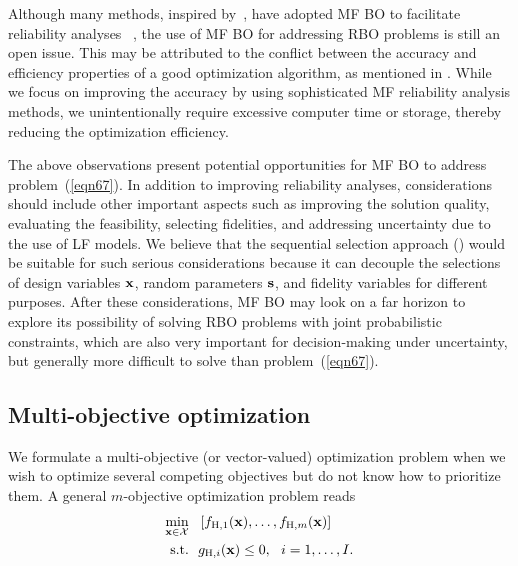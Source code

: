 \documentclass[journal ]{new-aiaa}
\begin{document}
	Although many methods, inspired by~\citet{Bichon2008}, have adopted MF BO to facilitate reliability analyses ~\citep[see e.g.,][]{Chaudhuri2021,Patsialis2021,ZhangC2022,AshwinRenganathan2023}, the use of MF BO for addressing RBO problems is still an open issue.
	This may be attributed to the conflict between the accuracy and efficiency properties of a good optimization algorithm, as mentioned in .
	While we focus on improving the accuracy by using sophisticated MF reliability analysis methods, we unintentionally require excessive computer time or storage, thereby reducing the optimization efficiency.    
	
	The above observations present potential opportunities for MF BO to address problem~(\ref{eqn67}).
	In addition to improving reliability analyses, considerations should include other important aspects such as improving the solution quality, evaluating the feasibility, selecting fidelities, and addressing uncertainty due to the use of LF models.
	We believe that the sequential selection approach () would be suitable for such serious considerations because it can decouple the selections of design variables $\bf x$, random parameters $\bf s$, and fidelity variables for different purposes.   
	After these considerations, MF BO may look on a far horizon to explore its possibility of solving RBO problems with joint probabilistic constraints, which are also very important for decision-making under uncertainty, but generally more difficult to solve than problem~(\ref{eqn67}).
	
	\subsection{Multi-objective optimization}\label{Sec64}
	
	We formulate a multi-objective (or vector-valued) optimization problem when we wish to optimize several competing objectives but do not know how to prioritize them.
	A general $m$-objective optimization problem reads
	\begin{equation}\label{eqn68}
		\begin{aligned}
			\underset{{\bf x} \in \mathcal{X}}{\min} \ \ & \left[f_{\text{H},1}({\bf x}),\dots,f_{\text{H},m}({\bf x})\right]\\
			\textrm{s.t.} \ \ 
			& g_{\text{H},i}({\bf x}) \leq 0,\ \ i=1,\dots,I. 
		\end{aligned}
	\end{equation}
	
\end{document}
